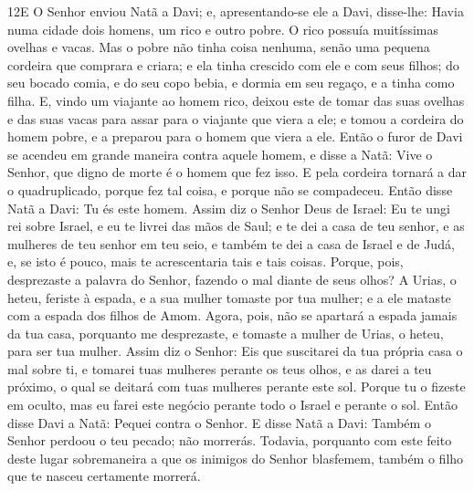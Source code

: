 \lettrine{12} E O Senhor enviou Natã a Davi; e,
apresentando-se ele a Davi, disse-lhe: Havia numa cidade dois
homens, um rico e outro pobre. O rico possuía muitíssimas
ovelhas e vacas. Mas o pobre não tinha coisa nenhuma, senão uma
pequena cordeira que comprara e criara; e ela tinha crescido com ele
e com seus filhos; do seu bocado comia, e do seu copo bebia, e
dormia em seu regaço, e a tinha como filha. E, vindo um viajante
ao homem rico, deixou este de tomar das suas ovelhas e das suas
vacas para assar para o viajante que viera a ele; e tomou a cordeira
do homem pobre, e a preparou para o homem que viera a ele. Então
o furor de Davi se acendeu em grande maneira contra aquele homem, e
disse a Natã: Vive o Senhor, que digno de morte é o homem que fez
isso. E pela cordeira tornará a dar o quadruplicado, porque fez
tal coisa, e porque não se compadeceu. Então disse Natã a Davi:
Tu és este homem. Assim diz o Senhor Deus de Israel: Eu te ungi rei
sobre Israel, e eu te livrei das mãos de Saul; e te dei a casa
de teu senhor, e as mulheres de teu senhor em teu seio, e também te
dei a casa de Israel e de Judá, e, se isto é pouco, mais te
acrescentaria tais e tais coisas. Porque, pois, desprezaste a
palavra do Senhor, fazendo o mal diante de seus olhos? A Urias, o
heteu, feriste à espada, e a sua mulher tomaste por tua mulher; e a
ele mataste com a espada dos filhos de Amom. Agora, pois, não
se apartará a espada jamais da tua casa, porquanto me desprezaste, e
tomaste a mulher de Urias, o heteu, para ser tua mulher.
Assim diz o Senhor: Eis que suscitarei da tua própria casa o
mal sobre ti, e tomarei tuas mulheres perante os teus olhos, e as
darei a teu próximo, o qual se deitará com tuas mulheres perante
este sol. Porque tu o fizeste em oculto, mas eu farei este
negócio perante todo o Israel e perante o sol. Então disse
Davi a Natã: Pequei contra o Senhor. E disse Natã a Davi: Também o
Senhor perdoou o teu pecado; não morrerás. Todavia, porquanto
com este feito deste lugar sobremaneira a que os inimigos do Senhor
blasfemem, também o filho que te nasceu certamente morrerá.

